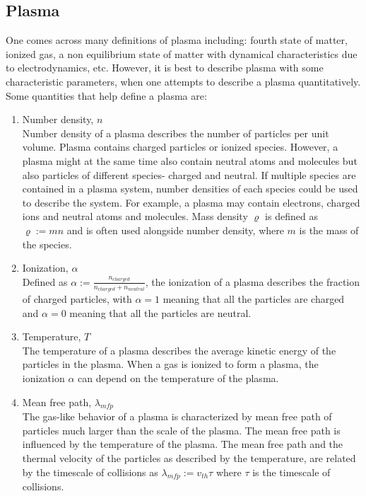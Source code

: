 \documentclass[12pt]{article}
\begin{document}
	\subsection{Plasma}
	One comes across many definitions of plasma including: fourth state of matter, ionized gas, a non equilibrium state of matter with dynamical characteristics due to electrodynamics, etc. However, it is best to describe plasma with some characteristic parameters, when one attempts to describe a plasma quantitatively. Some quantities that help define a plasma are:
	\begin{enumerate}
		\item Number density, $n$ \\
		Number density of a plasma describes the number of particles per unit volume. Plasma contains charged particles or ionized species. However, a plasma might at the same time also contain neutral atoms and molecules but also particles of different species- charged and neutral. If multiple species are contained in a plasma system, number densities of each species could be used to describe the system. For example, a plasma may contain electrons, charged ions and neutral atoms and molecules. Mass density $\varrho$ is defined as $\varrho := m n$ and is often used alongside number density, where $m$ is the mass of the species.
		
		\item Ionization, $\alpha$ \\
		Defined as $\alpha := \frac{\displaystyle n_{charged}}{\displaystyle n_{charged} + n_{neutral}}$, the ionization of a plasma describes the fraction of charged particles, with $\alpha = 1$ meaning that all the particles are charged and $\alpha = 0$ meaning that all the particles are neutral.
		
		\item Temperature, $T$ \\
		The temperature of a plasma describes the average kinetic energy of the particles in the plasma. When a gas is ionized to form a plasma, the ionization $\alpha$ can depend on the temperature of the plasma.
		
		\item Mean free path, $\lambda_{mfp}$ \\
		The gas-like behavior of a plasma is characterized by mean free path of particles much larger than the scale of the plasma. The mean free path is influenced by the temperature of the plasma. The mean free path and the thermal velocity of the particles as described by the temperature, are related by the timescale of collisions as $\lambda_{mfp} := v_{th} \tau$ where $\tau$ is the timescale of collisions. 
		

\end{enumerate}
\end{document}
